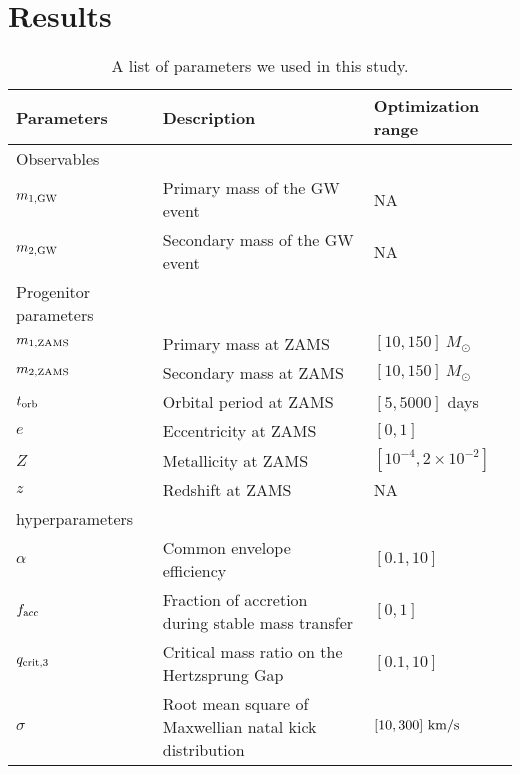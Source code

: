 \documentclass[twocolumn]{aastex631}
\begin{document}
\section{Results}
\label{sec:result}

\begin{table*}[hbt!]
    \begin{center}
    \begin{tabular}{ l l l }
    \hline
    \hline
    Parameters &  Description & Optimization range\\
    \hline
    \hline
    Observables &\ &\  \\
    \hline
    \hline
    $m_{\rm 1, GW}$ & Primary mass of the GW event & NA \\
    $m_{\rm 2, GW}$ & Secondary mass of the GW event  & NA\\
    \hline
    \hline
    Progenitor parameters &\ &\  \\
    \hline
    \hline
    $m_{\rm 1, ZAMS}$ & Primary mass at ZAMS & $[10,150]\ M_{\odot}$\\
    $m_{\rm 2, ZAMS}$ & Secondary mass at ZAMS & $[10,150]\ M_{\odot}$\\
    $t_{\rm orb}$ & Orbital period at ZAMS & $[5,5000]$ days\\
    $e$ & Eccentricity at ZAMS & $[0,1]$\\
    $Z$ & Metallicity at ZAMS & $[10^{-4},2\times10^{-2}]$\\
    $z$ & Redshift at ZAMS & NA\\
    \hline
    \hline
    hyperparameters &\ &\ \\
    \hline
    \hline

    $\alpha$ & Common envelope efficiency & $[0.1,10]$\\
    $f_{\rm acc}$ & Fraction of accretion during stable mass transfer & $[0,1]$\\
    $q_{\rm crit,3}$ & Critical mass ratio on the Hertzsprung Gap & $[0.1,10]$\\
    $\sigma$ & Root mean square of Maxwellian natal kick distribution& $[10,300]\ {\rm km/s}$\\


    \hline
    \hline
    \end{tabular}
    \caption{A list of parameters we used in this study.}
    \label{tab:parameters}
    \end{center}
\end{table*}
\end{document}
